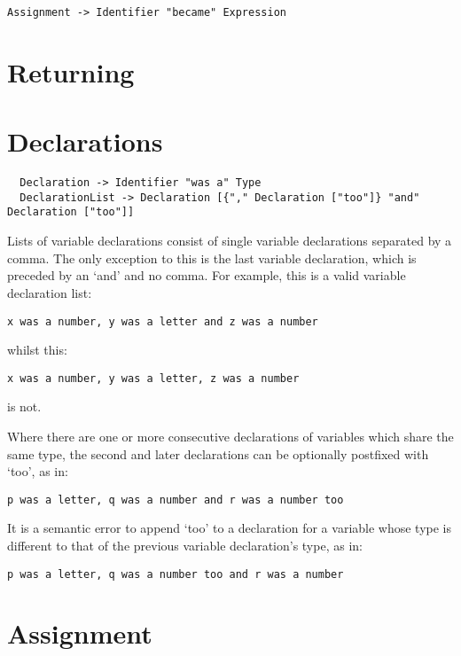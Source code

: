 \documentclass[a4wide, 11pt]{article}
\begin{document}
\begin{verbatim}
Assignment -> Identifier "became" Expression
\end{verbatim}

\section {Returning}

\section{Declarations}

\begin{verbatim}
  Declaration -> Identifier "was a" Type
  DeclarationList -> Declaration [{"," Declaration ["too"]} "and" Declaration ["too"]]
\end{verbatim}

Lists of variable declarations consist of single variable declarations separated by a comma. The only exception to this is the last variable declaration, which is preceded by an `and' and no comma. For example, this is a valid variable declaration list:

\begin{verbatim}
x was a number, y was a letter and z was a number
\end{verbatim}

whilst this:

\begin{verbatim}
x was a number, y was a letter, z was a number
\end{verbatim}

is not.

Where there are one or more consecutive declarations of variables which share the same type, the second and later declarations can be optionally postfixed with `too', as in:

\begin{verbatim}
p was a letter, q was a number and r was a number too
\end{verbatim}

It is a semantic error to append `too' to a declaration for a variable whose type is different to that of the previous variable declaration's type, as in:

\begin{verbatim}
p was a letter, q was a number too and r was a number
\end{verbatim}

\section{Assignment}
\end{document}
